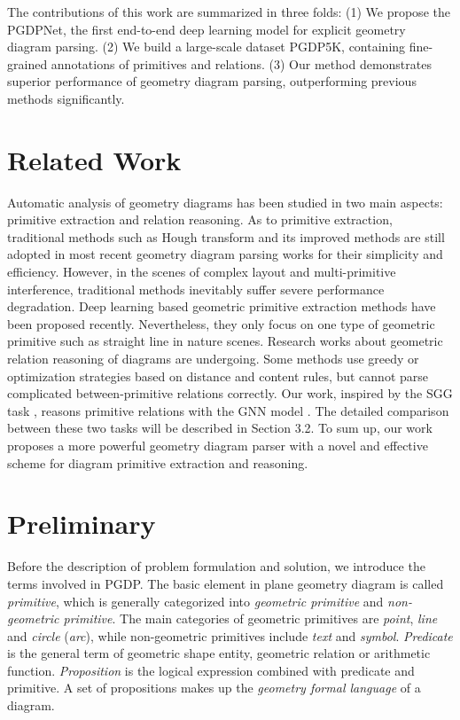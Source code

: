 \documentclass{article}
\begin{document}
The contributions of this work are summarized in three folds: (1) We propose the PGDPNet, the first end-to-end deep learning model for explicit geometry diagram parsing. (2) We build a large-scale dataset PGDP5K, containing fine-grained annotations of primitives and relations. (3) Our method demonstrates superior performance of geometry diagram parsing, outperforming previous methods significantly.

\section{Related Work}
Automatic analysis of geometry diagrams has been studied in two main aspects: primitive extraction and relation reasoning. As to primitive extraction, traditional methods such as Hough transform and its improved methods \cite{Pratt2001} are still adopted in most recent geometry diagram parsing works \cite{Seo2014,Seo2015,Gan2018,Lu2021} for their simplicity and efficiency. However, in the scenes of complex layout and multi-primitive interference, traditional methods inevitably suffer severe performance degradation. Deep learning based geometric primitive extraction methods \cite{Huang2018,Zhou2019} have been proposed recently. Nevertheless, they only focus on one type of geometric primitive such as straight line in nature scenes. Research works about geometric relation reasoning of diagrams are undergoing. Some methods \cite{Seo2014,Lu2021} use greedy or optimization strategies based on distance and content rules, but cannot parse complicated between-primitive relations correctly. Our work, inspired by the SGG task \cite{Xu2017,Liu2021,Guo2021}, reasons primitive relations with the GNN model \cite{Romero2018,Ye2020}. The detailed comparison between these two tasks will be described in Section 3.2. To sum up, our work proposes a more powerful geometry diagram parser with a novel and effective scheme for diagram primitive extraction and reasoning.



\section{Preliminary}
    Before the description of problem formulation and solution, we introduce the terms involved in PGDP. The basic element in plane geometry diagram is called \textit{primitive}, which is generally categorized into \textit{geometric primitive} and \textit{non-geometric primitive}. The main categories of geometric primitives are \textit{point}, \textit{line} and \textit{circle} (\textit{arc}), while non-geometric primitives include \textit{text} and \textit{symbol}. \textit{Predicate} is the general term of geometric shape entity, geometric relation or arithmetic function. \textit{Proposition} is the logical expression combined with predicate and primitive. A set of propositions makes up the \textit{geometry formal language} of a diagram.
\end{document}
